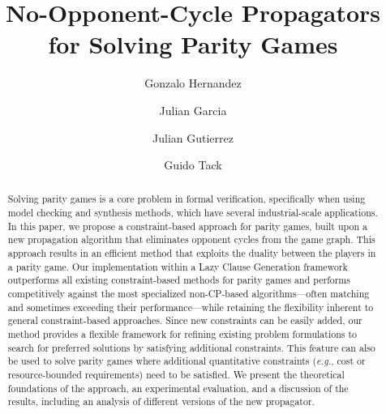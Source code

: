 \documentclass[runningheads]{llncs}
\begin{document}
%
\title{No-Opponent-Cycle Propagators \\for Solving Parity Games}

\author{
    Gonzalo Hernandez \and
    Julian Garcia \and
    Julian Gutierrez \and
    Guido Tack
}
%

%


%
\maketitle              %
%
\begin{abstract}
Solving parity games is a core problem in formal verification, specifically when using model checking and synthesis methods, which have several industrial-scale applications. In this paper, we propose a constraint-based approach for parity games, built upon a new propagation algorithm that eliminates opponent cycles from the game graph. This approach results in an efficient method that exploits the duality between the players in a parity game. Our implementation within a Lazy Clause Generation framework outperforms all existing constraint-based methods for parity games and performs competitively against the most specialized non-CP-based algorithms—often matching and sometimes exceeding their performance—while retaining the flexibility inherent to general constraint-based approaches.
%
Since new constraints can be easily added, our method provides a flexible framework for refining existing problem formulations to search for preferred solutions by satisfying additional constraints. 
%
This feature can also be used to solve parity games where additional quantitative constraints ({\em e.g.}, cost or resource-bounded requirements) need to be satisfied. 
We present the theoretical foundations of the approach, an experimental evaluation, and a discussion of the results, including an analysis of different versions of the new propagator.
\end{abstract}
%
\end{document}
